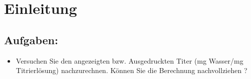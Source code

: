 
\section{Einleitung}
\label{sec:einleitung}

\subsection{Aufgaben:}
\begin{itemize}
	\item Versuchen Sie den angezeigten bzw. Ausgedruckten Titer (mg Wasser/mg Titrierlösung) nachzurechnen. Können Sie die Berechnung nachvollziehen ?
\end{itemize}





